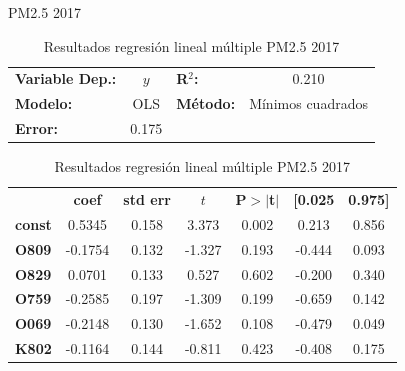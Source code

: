 \documentclass[11pt]{beamer}
\begin{document}
\begin{frame}{PM2.5 2017}
\begin{table}[hbt!]
\caption{Resultados regresión lineal múltiple PM2.5 2017}
\label{tab:RRLM PM2.5 2017}
\begin{center}
\begin{tabular}{lclc}
\textbf{Variable Dep.:}    &        $y$         & \textbf{  R$^2$:         } &     0.210   \\
\textbf{Modelo:}            &       OLS        & \textbf{Método:}           &  Mínimos cuadrados   \\
\textbf{Error:}            & 0.175  \\
\end{tabular}
\begin{tabular}{lcccccc}
               & \textbf{coef} & \textbf{std err} & \textbf{$t$} & \textbf{P$> |$t$|$} & \textbf{[0.025} & \textbf{0.975]}  \\
\textbf{const} &       0.5345  &        0.158     &     3.373  &         0.002        &        0.213    &        0.856     \\
\textbf{O809}  &      -0.1754  &        0.132     &    -1.327  &         0.193        &       -0.444    &        0.093     \\
\textbf{O829}  &       0.0701  &        0.133     &     0.527  &         0.602        &       -0.200    &        0.340     \\
\textbf{O759}  &      -0.2585  &        0.197     &    -1.309  &         0.199        &       -0.659    &        0.142     \\
\textbf{O069}  &      -0.2148  &        0.130     &    -1.652  &         0.108        &       -0.479    &        0.049     \\
\textbf{K802}  &      -0.1164  &        0.144     &    -0.811  &         0.423        &       -0.408    &        0.175     \\
\end{tabular}
\end{center}
\end{table}
\end{frame}
\end{document}
